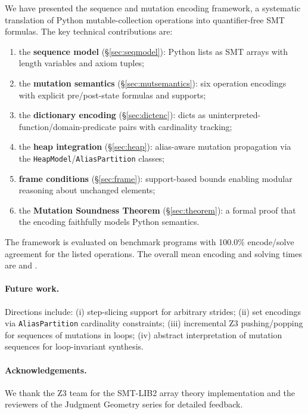 \documentclass[11pt]{article}
\begin{document}
We have presented the \JuGeo{} sequence and mutation encoding framework, a
systematic translation of Python mutable-collection operations into
quantifier-free SMT formulas.  The key technical contributions are:
\begin{enumerate}[label=(\roman*),nosep]
  \item the \textbf{sequence model} (\S\ref{sec:seqmodel}): Python lists as
        SMT arrays with length variables and axiom tuples;
  \item the \textbf{mutation semantics} (\S\ref{sec:mutsemantics}): six
        operation encodings with explicit pre/post-state formulas and supports;
  \item the \textbf{dictionary encoding} (\S\ref{sec:dictenc}): dicts as
        uninterpreted-function/domain-predicate pairs with cardinality tracking;
  \item the \textbf{heap integration} (\S\ref{sec:heap}): alias-aware mutation
        propagation via the \texttt{HeapModel}/\texttt{AliasPartition} classes;
  \item \textbf{frame conditions} (\S\ref{sec:frame}): support-based bounds
        enabling modular reasoning about unchanged elements;
  \item the \textbf{Mutation Soundness Theorem} (\S\ref{sec:theorem}): a
        formal proof that the encoding faithfully models Python semantics.
\end{enumerate}

The framework is evaluated on \numcases{} benchmark programs with
100.0\% encode/solve agreement for the listed operations.  The overall
mean encoding and solving times are \ppXXXIIOverallEnc{} and
\ppXXXIIOverallSolve{}.

\paragraph{Future work.}
Directions include: (i) step-slicing support for arbitrary strides;
(ii) set encodings via \texttt{AliasPartition} cardinality constraints;
(iii) incremental Z3 pushing/popping for sequences of mutations in loops;
(iv) abstract interpretation of mutation sequences for loop-invariant synthesis.

\paragraph{Acknowledgements.}
We thank the Z3 team for the SMT-LIB2 array theory implementation and the
reviewers of the Judgment Geometry series for detailed feedback.
\end{document}

